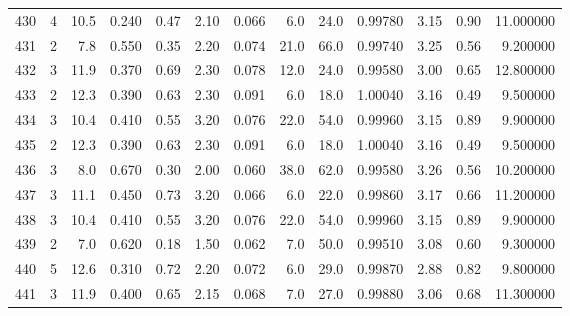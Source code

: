 \begin{tabular}{lrrrrrrrrrrrr}
430  &        4 &           10.5 &             0.240 &         0.47 &            2.10 &      0.066 &                  6.0 &                  24.0 &  0.99780 &  3.15 &       0.90 &  11.000000 \\
431  &        2 &            7.8 &             0.550 &         0.35 &            2.20 &      0.074 &                 21.0 &                  66.0 &  0.99740 &  3.25 &       0.56 &   9.200000 \\
432  &        3 &           11.9 &             0.370 &         0.69 &            2.30 &      0.078 &                 12.0 &                  24.0 &  0.99580 &  3.00 &       0.65 &  12.800000 \\
433  &        2 &           12.3 &             0.390 &         0.63 &            2.30 &      0.091 &                  6.0 &                  18.0 &  1.00040 &  3.16 &       0.49 &   9.500000 \\
434  &        3 &           10.4 &             0.410 &         0.55 &            3.20 &      0.076 &                 22.0 &                  54.0 &  0.99960 &  3.15 &       0.89 &   9.900000 \\
435  &        2 &           12.3 &             0.390 &         0.63 &            2.30 &      0.091 &                  6.0 &                  18.0 &  1.00040 &  3.16 &       0.49 &   9.500000 \\
436  &        3 &            8.0 &             0.670 &         0.30 &            2.00 &      0.060 &                 38.0 &                  62.0 &  0.99580 &  3.26 &       0.56 &  10.200000 \\
437  &        3 &           11.1 &             0.450 &         0.73 &            3.20 &      0.066 &                  6.0 &                  22.0 &  0.99860 &  3.17 &       0.66 &  11.200000 \\
438  &        3 &           10.4 &             0.410 &         0.55 &            3.20 &      0.076 &                 22.0 &                  54.0 &  0.99960 &  3.15 &       0.89 &   9.900000 \\
439  &        2 &            7.0 &             0.620 &         0.18 &            1.50 &      0.062 &                  7.0 &                  50.0 &  0.99510 &  3.08 &       0.60 &   9.300000 \\
440  &        5 &           12.6 &             0.310 &         0.72 &            2.20 &      0.072 &                  6.0 &                  29.0 &  0.99870 &  2.88 &       0.82 &   9.800000 \\
441  &        3 &           11.9 &             0.400 &         0.65 &            2.15 &      0.068 &                  7.0 &                  27.0 &  0.99880 &  3.06 &       0.68 &  11.300000 \\

\end{tabular}
